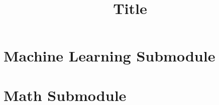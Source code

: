 \documentclass[
  fourColumns,
  landscape
]{formularyETH/formularyETH}
\title{Title}
\begin{document}
\section*{Machine Learning Submodule}\label{sec:ml_appendix}
  
\section*{Math Submodule}
  
% 
  
\end{document}
